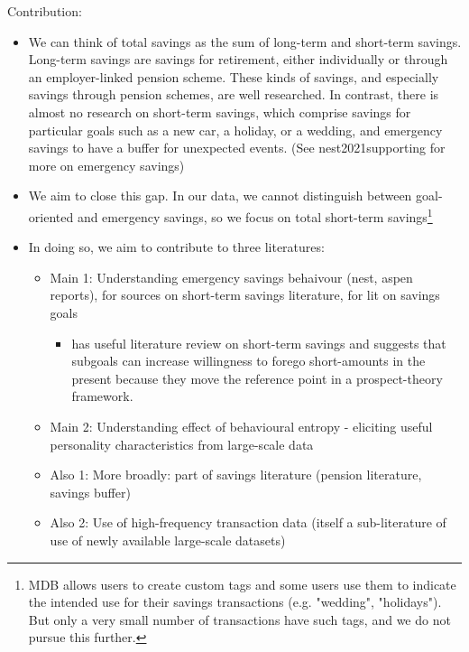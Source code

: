 Contribution:
\begin{itemize}

    \item We can think of total savings as the sum of long-term and short-term
        savings. Long-term savings are savings for retirement, either
        individually or through an employer-linked pension scheme. These kinds
        of savings, and especially savings through pension schemes, are well
        researched. In contrast, there is almost no research on short-term
        savings, which comprise savings for particular goals such as a new car,
        a holiday, or a wedding, and emergency savings to have a buffer for
        unexpected events. (See nest2021supporting for more on emergency
        savings)

    \item We aim to close this gap. In our data, we cannot distinguish between
        goal-oriented and emergency savings, so we focus on total short-term
        savings\footnote{MDB allows users to create custom tags and some users
            use them to indicate the intended use for their savings
            transactions (e.g. "wedding", "holidays"). But only a very small
        number of transactions have such tags, and we do not pursue this
    further.}

    \item In doing so, we aim to contribute to three literatures:

    \begin{itemize}

        \item Main 1: Understanding emergency savings behaivour (nest, aspen
            reports), \citep{sabat2019rules} for sources on short-term savings
            literature, \citet{colby2013savings} for lit on savings goals

            \begin{itemize}

                \item \citet{colby2013savings} has useful literature review on
                    short-term savings and suggests that subgoals can increase
                    willingness to forego short-amounts in the present because
                    they move the reference point in a prospect-theory
                    framework.

            \end{itemize}


        \item Main 2: Understanding effect of behavioural entropy - eliciting
            useful personality characteristics from large-scale data

        \item Also 1: More broadly: part of savings literature (pension literature,
            savings buffer)

        \item Also 2: Use of high-frequency transaction data (itself a sub-literature of
            use of newly available large-scale datasets)
    \end{itemize}
\end{itemize}

